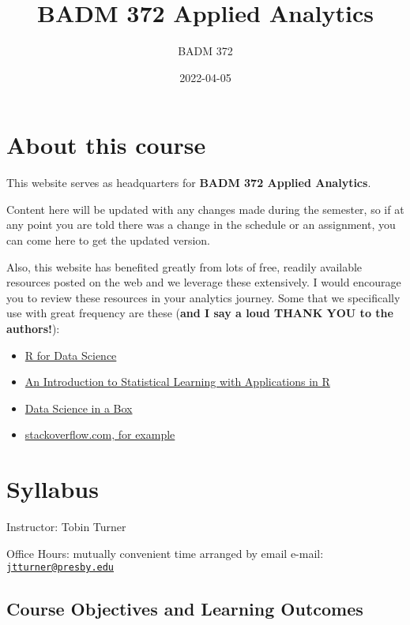 \documentclass[
]{book}
\title{BADM 372 Applied Analytics}
\author{BADM 372}
\date{2022-04-05}
\providecommand{\tightlist}{%
  \setlength{\itemsep}{0pt}\setlength{\parskip}{0pt}}
\begin{document}
\maketitle

{
\setcounter{tocdepth}{1}
\tableofcontents
}
\hypertarget{about-this-course}{%
\chapter{About this course}\label{about-this-course}}

This website serves as headquarters for \textbf{BADM 372 Applied Analytics}.

Content here will be updated with any changes made during the semester, so if at any point you are told there was a change in the schedule or an assignment, you can come here to get the updated version.

Also, this website has benefited greatly from lots of free, readily available resources posted on the web and we leverage these extensively. I would encourage you to review these resources in your analytics journey. Some that we specifically use with great frequency are these (\textbf{and I say a loud THANK YOU to the authors!}):

\begin{itemize}
\tightlist
\item
  \href{https://r4ds.had.co.nz/}{R for Data Science}
\item
  \href{https://trevorhastie.github.io/ISLR/}{An Introduction to Statistical Learning with Applications in R}
\item
  \href{https://datasciencebox.org/}{Data Science in a Box}
\item
  \href{https://stackoverflow.com/questions/4862178/remove-rows-with-all-or-some-nas-missing-values-in-data-frame?rq=1}{stackoverflow.com, for example}
\end{itemize}

\hypertarget{syllabus}{%
\chapter{Syllabus}\label{syllabus}}

Instructor: Tobin Turner

Office Hours: mutually convenient time arranged by email e-mail: \href{mailto:jtturner@presby.edu}{\nolinkurl{jtturner@presby.edu}}

\hypertarget{course-objectives-and-learning-outcomes}{%
\section{Course Objectives and Learning Outcomes}\label{course-objectives-and-learning-outcomes}}
\end{document}
